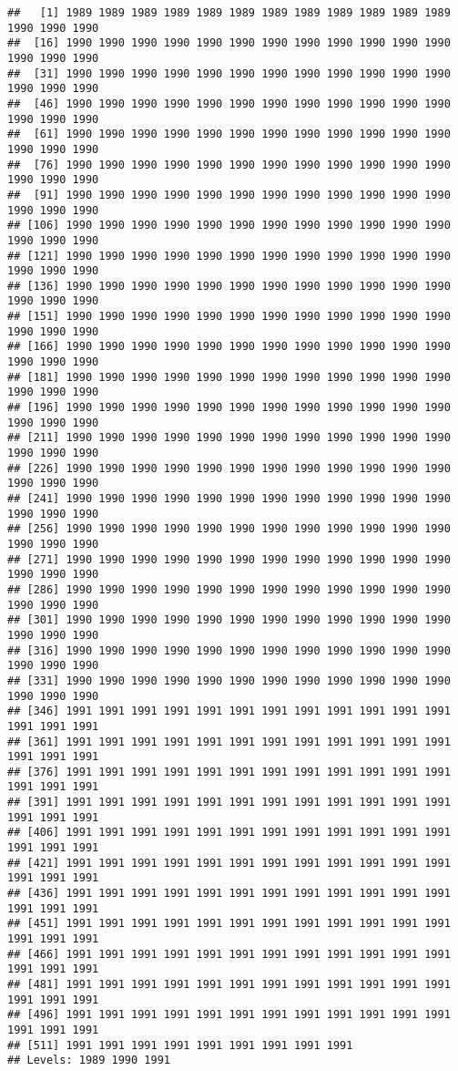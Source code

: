 \documentclass[
]{article}
\begin{document}
\begin{verbatim}
##   [1] 1989 1989 1989 1989 1989 1989 1989 1989 1989 1989 1989 1989 1990 1990 1990
##  [16] 1990 1990 1990 1990 1990 1990 1990 1990 1990 1990 1990 1990 1990 1990 1990
##  [31] 1990 1990 1990 1990 1990 1990 1990 1990 1990 1990 1990 1990 1990 1990 1990
##  [46] 1990 1990 1990 1990 1990 1990 1990 1990 1990 1990 1990 1990 1990 1990 1990
##  [61] 1990 1990 1990 1990 1990 1990 1990 1990 1990 1990 1990 1990 1990 1990 1990
##  [76] 1990 1990 1990 1990 1990 1990 1990 1990 1990 1990 1990 1990 1990 1990 1990
##  [91] 1990 1990 1990 1990 1990 1990 1990 1990 1990 1990 1990 1990 1990 1990 1990
## [106] 1990 1990 1990 1990 1990 1990 1990 1990 1990 1990 1990 1990 1990 1990 1990
## [121] 1990 1990 1990 1990 1990 1990 1990 1990 1990 1990 1990 1990 1990 1990 1990
## [136] 1990 1990 1990 1990 1990 1990 1990 1990 1990 1990 1990 1990 1990 1990 1990
## [151] 1990 1990 1990 1990 1990 1990 1990 1990 1990 1990 1990 1990 1990 1990 1990
## [166] 1990 1990 1990 1990 1990 1990 1990 1990 1990 1990 1990 1990 1990 1990 1990
## [181] 1990 1990 1990 1990 1990 1990 1990 1990 1990 1990 1990 1990 1990 1990 1990
## [196] 1990 1990 1990 1990 1990 1990 1990 1990 1990 1990 1990 1990 1990 1990 1990
## [211] 1990 1990 1990 1990 1990 1990 1990 1990 1990 1990 1990 1990 1990 1990 1990
## [226] 1990 1990 1990 1990 1990 1990 1990 1990 1990 1990 1990 1990 1990 1990 1990
## [241] 1990 1990 1990 1990 1990 1990 1990 1990 1990 1990 1990 1990 1990 1990 1990
## [256] 1990 1990 1990 1990 1990 1990 1990 1990 1990 1990 1990 1990 1990 1990 1990
## [271] 1990 1990 1990 1990 1990 1990 1990 1990 1990 1990 1990 1990 1990 1990 1990
## [286] 1990 1990 1990 1990 1990 1990 1990 1990 1990 1990 1990 1990 1990 1990 1990
## [301] 1990 1990 1990 1990 1990 1990 1990 1990 1990 1990 1990 1990 1990 1990 1990
## [316] 1990 1990 1990 1990 1990 1990 1990 1990 1990 1990 1990 1990 1990 1990 1990
## [331] 1990 1990 1990 1990 1990 1990 1990 1990 1990 1990 1990 1990 1990 1990 1990
## [346] 1991 1991 1991 1991 1991 1991 1991 1991 1991 1991 1991 1991 1991 1991 1991
## [361] 1991 1991 1991 1991 1991 1991 1991 1991 1991 1991 1991 1991 1991 1991 1991
## [376] 1991 1991 1991 1991 1991 1991 1991 1991 1991 1991 1991 1991 1991 1991 1991
## [391] 1991 1991 1991 1991 1991 1991 1991 1991 1991 1991 1991 1991 1991 1991 1991
## [406] 1991 1991 1991 1991 1991 1991 1991 1991 1991 1991 1991 1991 1991 1991 1991
## [421] 1991 1991 1991 1991 1991 1991 1991 1991 1991 1991 1991 1991 1991 1991 1991
## [436] 1991 1991 1991 1991 1991 1991 1991 1991 1991 1991 1991 1991 1991 1991 1991
## [451] 1991 1991 1991 1991 1991 1991 1991 1991 1991 1991 1991 1991 1991 1991 1991
## [466] 1991 1991 1991 1991 1991 1991 1991 1991 1991 1991 1991 1991 1991 1991 1991
## [481] 1991 1991 1991 1991 1991 1991 1991 1991 1991 1991 1991 1991 1991 1991 1991
## [496] 1991 1991 1991 1991 1991 1991 1991 1991 1991 1991 1991 1991 1991 1991 1991
## [511] 1991 1991 1991 1991 1991 1991 1991 1991 1991
## Levels: 1989 1990 1991
\end{verbatim}
\end{document}
